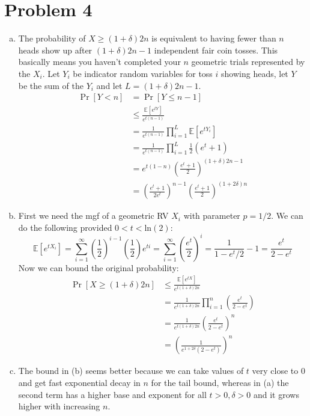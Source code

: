 \documentclass[11pt]{article}
\newcommand{\E}{\mathbb{E}}
\newcommand{\p}[1]{\left(#1\right)}
\renewcommand{\ln}[1]{\text{ln}\p{#1}}
\begin{document}
\newpage
\section*{Problem 4}
\begin{enumerate}[(a)]
\item The probability of $X\geq (1+\delta)2n$ is equivalent to having fewer than $n$ heads show up after $(1+\delta)2n-1$ independent fair coin tosses. This basically means you haven't completed your $n$ geometric trials represented by the $X_i$. Let $Y_i$ be indicator random variables for toss $i$ showing heads, let $Y$ be the sum of the $Y_i$ and let $L=(1+\delta)2n-1$. \begin{align*}
\Pr[Y<n] &= \Pr[Y\leq n-1]\\
&\leq \frac{\E[e^{tY}]}{e^{t(n-1)}}\\
&= \frac1{e^{t(n-1)}}\prod_{i=1}^L\E[e^{tY_i}]\\
&= \frac1{e^{t(n-1)}}\prod_{i=1}^L\frac12(e^t+1)\\
&= e^{t(1-n)}\left(\frac{e^t+1}2\right)^{(1+\delta)2n-1}\\
&= \left(\frac{e^t+1}{2e^t}\right)^{n-1}\left(\frac{e^t+1}2\right)^{(1+2\delta)n}
\end{align*}
\item First we need the mgf of a geometric RV $X_i$ with parameter $p=1/2$. We can do the following provided $0<t<\ln2$: $$\E[e^{tX_i}]=\sum_{i=1}^{\infty}(\frac12)^{i-1}(\frac12)e^{ti}=\sum_{i=1}^{\infty}(\frac{e^t}2)^i=\frac1{1-e^t/2}-1=\frac{e^t}{2-e^t}$$ Now we can bound the original probability: \begin{align*}
\Pr[X\geq(1+\delta)2n] &\leq \frac{\E[e^{tX}]}{e^{t(1+\delta)2n}}\\
&= \frac1{e^{t(1+\delta)2n}}\prod_{i=1}^n\left(\frac{e^t}{2-e^t}\right)\\
&= \frac1{e^{t(1+\delta)2n}}\left(\frac{e^t}{2-e^t}\right)^n\\
&= \left(\frac1{e^{1+2\delta}(2-e^t)}\right)^n
\end{align*}
\item The bound in (b) seems better because we can take values of $t$ very close to $0$ and get fast exponential decay in $n$ for the tail bound, whereas in (a) the second term has a higher base and exponent for all $t>0,\delta>0$ and it grows higher with increasing $n$.
\end{enumerate}


\newpage
\end{document}
